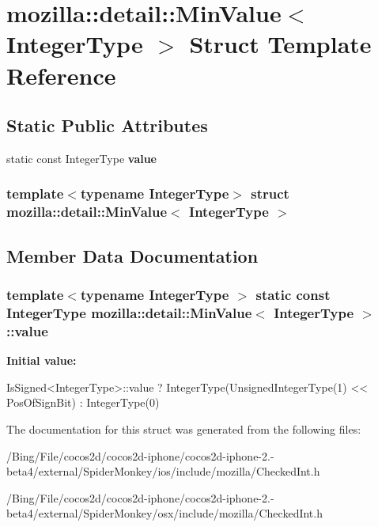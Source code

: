 \hypertarget{structmozilla_1_1detail_1_1_min_value}{\section{mozilla\-:\-:detail\-:\-:Min\-Value$<$ Integer\-Type $>$ Struct Template Reference}
\label{structmozilla_1_1detail_1_1_min_value}
}
\subsection*{Static Public Attributes}
\begin{DoxyCompactItemize}
\item 
static const Integer\-Type {\bfseries value}
\end{DoxyCompactItemize}
\subsubsection*{template$<$typename Integer\-Type$>$ struct mozilla\-::detail\-::\-Min\-Value$<$ Integer\-Type $>$}



\subsection{Member Data Documentation}
\hypertarget{structmozilla_1_1detail_1_1_min_value_af39ab01d26ab0d27c018534862c6faf1}{
\subsubsection[{value}]{\setlength{\rightskip}{0pt plus 5cm}template$<$typename Integer\-Type $>$ static const Integer\-Type {\bf mozilla\-::detail\-::\-Min\-Value}$<$ Integer\-Type $>$\-::value}}\label{structmozilla_1_1detail_1_1_min_value_af39ab01d26ab0d27c018534862c6faf1}
{\bfseries Initial value\-:}
\begin{DoxyCode}

        IsSigned<IntegerType>::value
        ? IntegerType(UnsignedIntegerType(1) << PosOfSignBit)
        : IntegerType(0)
\end{DoxyCode}


The documentation for this struct was generated from the following files\-:\begin{DoxyCompactItemize}
\item 
/\-Bing/\-File/cocos2d/cocos2d-\/iphone/cocos2d-\/iphone-\/2.-\/beta4/external/\-Spider\-Monkey/ios/include/mozilla/Checked\-Int.\-h\item 
/\-Bing/\-File/cocos2d/cocos2d-\/iphone/cocos2d-\/iphone-\/2.-\/beta4/external/\-Spider\-Monkey/osx/include/mozilla/Checked\-Int.\-h\end{DoxyCompactItemize}
